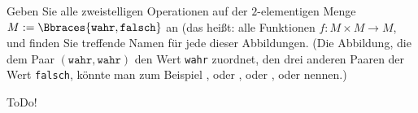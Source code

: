 
\begin{exercise}[16]

Geben Sie alle zweistelligen Operationen auf der $2$-elementigen Menge $M := \Bbraces{\texttt{wahr}, \texttt{falsch}}$ an (das heißt: alle Funktionen $f: M \times M \to M$, und finden Sie treffende Namen für jede dieser Abbildungen.
(Die Abbildung, die dem Paar $(\texttt{wahr}, \texttt{wahr})$ den Wert \texttt{wahr} zuordnet, den drei anderen Paaren der Wert \texttt{falsch}, könnte man zum Beispiel , oder , oder , oder  nennen.)

\end{exercise}


\begin{solution}

ToDo!

\end{solution}


